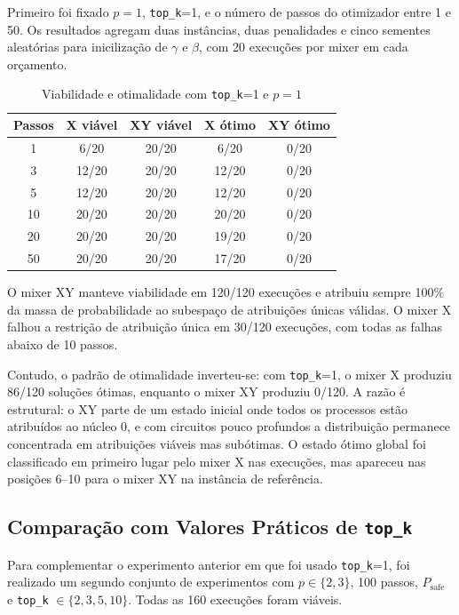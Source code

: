 Primeiro foi fixado $p=1$, \texttt{top\_k}=1, e o número de passos do 
otimizador entre 1 e 50. Os resultados agregam duas instâncias, duas penalidades 
e cinco sementes aleatórias para inicilização de $\gamma$ e $\beta$, com 20 execuções por mixer em cada orçamento.

\begin{table}[H]
\centering
\begin{tabular}{|c|c|c|c|c|}
\hline
\textbf{Passos} & \textbf{X viável} & \textbf{XY viável} & 
\textbf{X ótimo} & \textbf{XY ótimo} \\
\hline
1  & 6/20  & 20/20 & 6/20  & 0/20 \\
3  & 12/20 & 20/20 & 12/20 & 0/20 \\
5  & 12/20 & 20/20 & 12/20 & 0/20 \\
10 & 20/20 & 20/20 & 20/20 & 0/20 \\
20 & 20/20 & 20/20 & 19/20 & 0/20 \\
50 & 20/20 & 20/20 & 17/20 & 0/20 \\
\hline
\end{tabular}
\caption{Viabilidade e otimalidade com \texttt{top\_k}=1 e $p=1$}
\label{tab:resultados-mx3}
\end{table}

O mixer XY manteve viabilidade em 120/120 execuções e atribuiu sempre 100\% da 
massa de probabilidade ao subespaço de atribuições únicas válidas. O mixer X falhou a restrição 
de atribuição única em 30/120 execuções, com todas as falhas abaixo de 10 passos.

Contudo, o padrão de otimalidade inverteu-se: com \texttt{top\_k}=1, o mixer X 
produziu 86/120 soluções ótimas, enquanto o mixer XY produziu 0/120. A razão é 
estrutural: o XY parte de um estado inicial onde todos os processos estão 
atribuídos ao núcleo 0, e com circuitos pouco profundos a distribuição permanece 
concentrada em atribuições viáveis mas subótimas. O estado ótimo global foi 
classificado em primeiro lugar pelo mixer X nas execuções, mas 
apareceu nas posições 6--10 para o mixer XY na instância de referência.

\subsection{Comparação com Valores Práticos de \texttt{top\_k}}

Para complementar o experimento anterior em que foi usado \texttt{top\_k}=1, foi realizado um segundo
conjunto de experimentos com $p \in \{2, 3\}$, 100 passos, $P_\text{safe}$ e
\texttt{top\_k} $\in \{2, 3, 5, 10\}$. Todas as 160 execuções foram viáveis.


